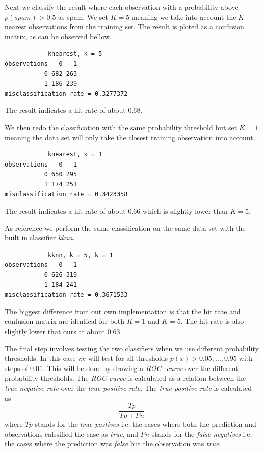 \documentclass[a4paper,12pt]{article}
\begin{document}
Next we classify the result where each observation with a probability above \( p(spam) > 0.5\) as spam. We set \(K = 5\) meaning we take into account the \(K\) nearest observations from the training set. The result is ploted as a confusion matrix, as can be observed bellow. 
\begin{verbatim}
            knearest, k = 5
observations   0   1
           0 682 263
           1 186 239
misclassification rate = 0.3277372
\end{verbatim}
The result indicates a hit rate of about \(0.68\).

We then redo the classification with the same probability threshold but set \(K = 1\) meaning the data set will only take the closest training observation into account.
\begin{verbatim}
            knearest, k = 1
observations   0   1
           0 650 295
           1 174 251
misclassification rate = 0.3423358
\end{verbatim}
The result indicates a hit rate of about \(0.66\) which is slightly lower than \( K = 5\).

As reference we perform the same classification on the same data set with the built in classifier \textit{kknn}. 
\begin{verbatim}
            kknn, k = 5, k = 1
observations   0   1
           0 626 319
           1 184 241
misclassification rate = 0.3671533
\end{verbatim}
The biggest difference from out own implementation is that the hit rate and confusion matrix are identical for both \(K = 1\) and \(K = 5\). The hit rate is also slightly lower that ours at about \( 0.63\).

The final step involves testing the two classifiers when we use different probability thresholds. In this case we will test for all thresholds \( p(x) > 0.05,...,0.95\) with steps of \(0.01\). This will be done by drawing a \textit{ROC- curve} over the different probability thresholds. The \textit{ROC-curve} is calculated as a relation between the \textit{true negative rate} over the \textit{true positive rate}. The \textit{true positive rate} is calculated as
\begin{equation}
 \frac{Tp}{Tp + Fn}
\end{equation}
where \(Tp\) stands for the \textit{true postives} i.e. the cases where both the prediction and observations calssified the case as \textit{true}, and \(Fn\) stands for the \textit{false negatives} i.e. the cases where the prediction was \textit{false} but the observation was \textit{true}.
\end{document}
